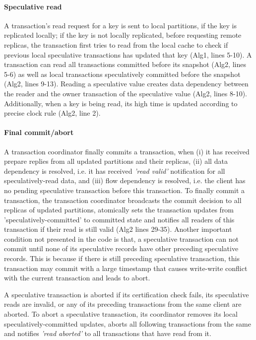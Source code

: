 \paragraph{Speculative read}  A transaction's read request for a key is sent to local partitions, if the key is replicated locally; if the key is not locally replicated, before requesting remote replicas, the transaction first tries to read from the local cache to check if previous local speculative transactions has updated that key (Alg1, lines 5-10). A transaction can read all transactions committed before its snapshot (Alg2, lines 5-6) as well as local transactions speculatively committed before the snapshot (Alg2, lines 9-13). Reading a speculative value creates data dependency between the reader and the owner transaction of the speculative value (Alg2, lines 8-10). Additionally, when a key is being read, its high time is updated according to precise clock rule (Alg2, line 2).

\paragraph{Final commit/abort} A transaction coordinator finally commits a transaction, when (i) it has received prepare replies from all updated partitions and their replicas, (ii) all data dependency is resolved, i.e. it has received \textit{'read valid'} notification for all speculatively-read data, and (iii) flow dependency is resolved, i.e. the client has no pending speculative transaction before this transaction. To finally commit a transaction, the transaction coordinator broadcasts the commit decision to all replicas of updated partitions, atomically sets the transaction updates from 'speculatively-committed' to committed state and notifies all readers of this transaction if their read is still valid (Alg2 lines 29-35). Another important condition not presented in the code is that, a speculative transaction can not commit until none of its speculative records have other preceding speculative records. This is because if there is still preceding speculative transaction, this transaction may commit with a large timestamp that causes write-write conflict with the current transaction and leads to abort.

A speculative transaction is aborted if its certification check fails, its speculative reads are invalid, or any of its preceding transactions from the same  client are aborted. To abort a speculative transaction, its coordinator removes its local speculatively-committed updates, aborts all following transactions from the same and notifies \textit{'read aborted'} to all transactions that have read from it. 

